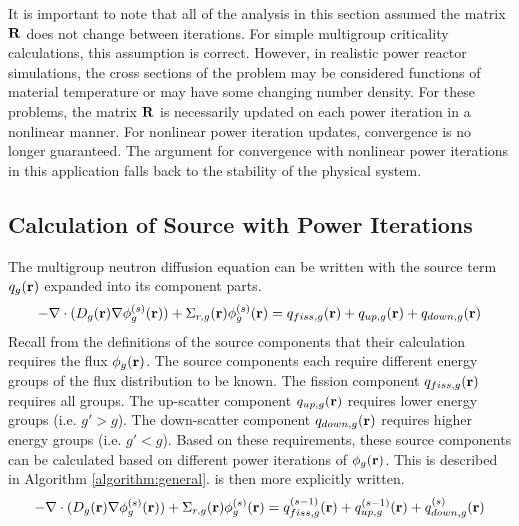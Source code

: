     It is important to note that all of the analysis in this section assumed the
    matrix $\mathbf{R}$ does not change between iterations. For simple multigroup
    criticality calculations, this assumption is correct. However, in realistic
    power reactor simulations, the cross sections of the problem may be 
    considered functions of material temperature or may have some changing
    number density. For these problems, the matrix $\mathbf{R}$ is necessarily updated
    on each power iteration in a nonlinear manner. For nonlinear power
    iteration updates, convergence is no longer guaranteed. The argument for
    convergence with nonlinear power iterations in this application falls back
    to the stability of the physical system.
    
  \subsection{Calculation of Source with Power Iterations}

    The multigroup neutron diffusion equation  can be
    written with the source term $q_g(\mathbf{r})$ expanded into its component parts.
    \begin{equation} \label{eq:multigroup_source_expand}
      -\mathbf{\nabla} \cdot (D_g(\mathbf{r}) \mathbf{\nabla} \phi_g^{(s)}(\mathbf{r})) + \Sigma_{r,g}(\mathbf{r})
      \phi_g^{(s)}(\mathbf{r}) = q_{fiss,g}(\mathbf{r}) + q_{up,g}(\mathbf{r}) + q_{down,g}(\mathbf{r})
    \end{equation}
    Recall from the definitions of the source components that their calculation
    requires the flux $\phi_g(\mathbf{r})$. The source components each require
    different energy groups of the flux distribution to be known. The fission
    component $q_{fiss,g}(\mathbf{r})$ requires all groups. The up-scatter component
    $q_{up,g}(\mathbf{r})$ requires lower energy groups (i.e. $g' > g$). The
    down-scatter component $q_{down,g}(\mathbf{r})$ requires higher energy groups (i.e.
    $g' < g$). Based on these requirements, these source components can be
    calculated based on different power iterations of $\phi_g(\mathbf{r})$. This is
    described in Algorithm \ref{algorithm:general}.
     is then more explicitly written.
    \begin{equation} \label{eq:multigroup_power_iterations}
      -\mathbf{\nabla} \cdot (D_g(\mathbf{r}) \mathbf{\nabla} \phi_g^{(s)}(\mathbf{r})) + \Sigma_{r,g}(\mathbf{r})
      \phi_g^{(s)}(\mathbf{r}) = q_{fiss,g}^{(s-1)}(\mathbf{r}) + q_{up,g}^{(s-1)}(\mathbf{r}) +
      q_{down,g}^{(s)}(\mathbf{r})
    \end{equation}

